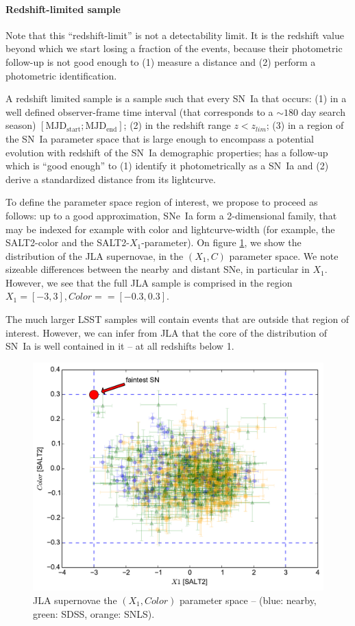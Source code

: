 \documentclass[\docopts]{\docclass}
\begin{document}
\paragraph{Redshift-limited sample} Note that this ``redshift-limit''
is not a detectability limit. It is the redshift value beyond which
we start losing a fraction of the events, because their photometric
follow-up is not good enough to (1) measure a distance and (2) perform
a photometric identification.


A redshift limited sample is a sample such that every SN~Ia that occurs:
(1) in a well defined observer-frame time interval (that corresponds
  to a $\sim 180$ day search season) $\mathrm{[MJD_{start}; MJD_{end}]}$;
(2) in the redshift range $z < z_{lim}$;
(3) in a region of the SN~Ia parameter space that is large enough to
  encompass a potential evolution with redshift of the SN~Ia
  demographic properties;
has a follow-up which is ``good enough'' to (1) identify it
photometrically as a SN~Ia and (2) derive a standardized distance from
its lightcurve.

To define the parameter space region of interest, we propose to
proceed as follows: up to a good approximation, SNe~Ia form a
2-dimensional family, that may be indexed for example with color and
lightcurve-width (for example, the SALT2-color and the
SALT2-$X_1$-parameter).  On figure \ref{fig:jla_X1_C}, we show the
distribution of the JLA supernovae, in the $(X_1,C)$ parameter
space. We note sizeable differences between the nearby and distant
SNe, in particular in $X_1$.  However, we see that the full JLA sample
is comprised in the region $X_1 = [-3,3], Color= = [-0.3, 0.3]$.

The much larger LSST samples will contain events that are outside that
region of interest.  However, we can infer from JLA that the core of
the distribution of SN~Ia is well contained in it -- at all redshifts
below 1.


\begin{figure}[t]
\begin{center}
\includegraphics[width=0.75\linewidth]{sn_parameter_space.pdf}
\caption{JLA supernovae the $(X_1,Color)$ parameter space -- (blue:
  nearby, green: SDSS, orange: SNLS).  }
\label{fig:jla_X1_C}
\end{center}
\end{figure}
\end{document}
